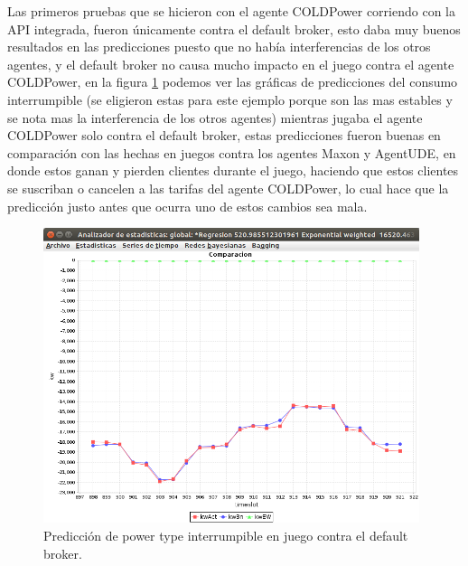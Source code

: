 Las primeros pruebas que se hicieron con el agente COLDPower corriendo con la API integrada, fueron únicamente contra el default broker, esto daba muy buenos resultados en las predicciones puesto que no había interferencias de los otros agentes, y el default broker no causa  mucho impacto en el juego contra el agente COLDPower, en la figura \ref{fig:errorGlobalInterrumpible1agente} podemos ver las gráficas de predicciones del consumo interrumpible (se eligieron estas para este ejemplo porque son las mas estables y se nota mas la interferencia de los otros agentes) mientras jugaba el agente COLDPower solo contra el default broker, estas predicciones fueron buenas en comparación con las hechas en juegos contra los agentes Maxon y AgentUDE, en donde estos ganan y pierden clientes durante el juego, haciendo que estos clientes se suscriban o cancelen a las tarifas del agente COLDPower, lo cual hace que la predicción justo antes que ocurra uno de estos cambios sea mala.

\begin{figure}[h]
	\centering
	\includegraphics[width=11cm]{img/errorGlobalInterrumpible1agente.png}
	\caption{Predicción de power type interrumpible en juego contra el default broker.}
	\label{fig:errorGlobalInterrumpible1agente}
\end{figure}


